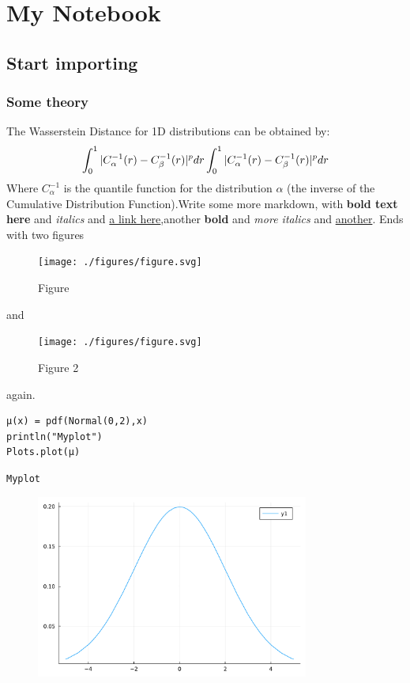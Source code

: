 \newpage

\chapter{My Notebook}

\section{Start importing}

\subsection{Some theory}
The Wasserstein Distance for 1D distributions can be obtained by:
\begin{displaymath}
	\int_0^1 |C_\alpha^{-1}(r) - C_\beta^{-1}(r)|^p dr \\
	\int_0^1 |C_\alpha^{-1}(r) - C_\beta^{-1}(r)|^p dr
\end{displaymath}
Where $C_\alpha^{-1}$ is the quantile function for the distribution $\alpha$ (the inverse of the Cumulative Distribution Function).Write some more markdown, with \textbf{bold text here} and \textit{italics} and \href{https://juliaoptimaltransport.github.io/OptimalTransport.jl/stable/examples/basic/}{a link here},another \textbf{bold} and \textit{more italics} and \href{https://github.com/}{another}. Ends with two figures
\begin{figure}[H]
	 \centering
	\texttt{[image: ./figures/figure.svg]}
	\caption{Figure}
	\label{fig:figure.svg}
\end{figure}
 and
\begin{figure}[H]
	 \centering
	\texttt{[image: ./figures/figure.svg]}
	\caption{Figure 2}
	\label{fig:figure.svg}
\end{figure}
 again.
\begin{lstlisting}[language=JuliaLocal, style=julia]
μ(x) = pdf(Normal(0,2),x)
println("Myplot")
Plots.plot(μ)
\end{lstlisting}

\begin{verbatim}
Myplot

\end{verbatim}

\begin{figure}[H]
	\centering
	\includegraphics[width=0.8\textwidth]{./figures/jupyternotebook_figure1.pdf}
	\label{fig:jupyternotebook_figure1}

\end{figure}

